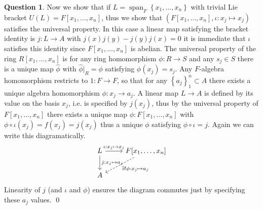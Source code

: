 \documentclass[10.5pt]{article}
\theoremstyle{definition}
\newtheorem{pb}{Question}
\numberwithin{example}{subsection}
\numberwithin{proposition}{subsection}
\newcommand{\set}[1]{\left\{#1\right\}}
\begin{document}
\begin{pb}
        Now we show that if \(L = \operatorname{span}_F\set{x_1,\hdots,x_n}\) with trivial Lie bracket \(U(L) = F[x_1,\hdots,x_n]\), thus we show that \((F[x_1,\hdots,x_n],\iota: x_j \mapsto x_j)\) satisfies the universal property. In this case a linear map satisfying the bracket identity is \(j: L \to A\) with \(j(x)j(y) - j(y)j(x) = 0\) it is immediate that \(\iota\) satisfies this identity since \(F[x_1,\hdots,x_n]\) is abelian. The universal property of the ring \(R[x_1,\hdots,x_n]\) is for any ring homomorphism \(\phi: R \to S\) and any \(s_j \in S\) there is a unique map \(\hat{\phi}\) with \(\hat{\phi}\vert_R = \phi\) satisfying \(\hat{\phi}(x_j) = s_j\). Any \(F\)-algebra homomorphism restricts to \(1: F \to F\), so that for any \(\set{a_j}_1^n \subset A\) there exists a unique algebra homomorphism \(\phi: x_j \to a_j\). A linear map \(L \to A\) is defined by its value on the basis \(x_j\), i.e. is specified by \(j(x_j)\), thus by the universal property of \(F[x_1,\hdots,x_n]\) there exists a unique map \(\phi: F[x_1,\hdots,x_n]\) with \(\phi\circ\iota(x_j) = f(x_j) = j(x_j)\) thus a unique \(\phi\) satisfying \(\phi \circ \iota = j\). Again we can write this diagramatically.
        \begin{equation}\begin{tikzcd}
            L \arrow[d,"j: x_j \mapsto a_j"] \arrow[r,"\iota: x_j \mapsto x_j"] &F[x_1,\hdots,x_n] \arrow[ld,dashed, "\exists! \phi: x_j \mapsto a_j"] \\
            A
        \end{tikzcd}\end{equation}
        Linearity of \(j\) (and \(\iota\) and \(\phi\)) ensures the diagram commutes just by specifying these \(a_j\) values. \qed


\end{pb}
\end{document}
